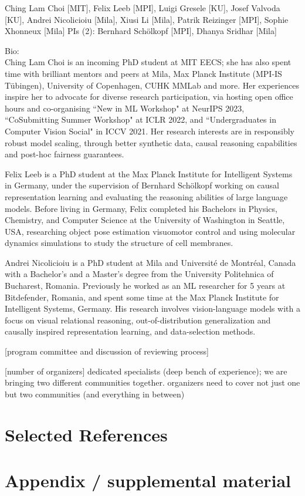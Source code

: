 \documentclass{article}
\begin{document}
Ching Lam Choi [MIT], Felix Leeb [MPI], Luigi Gresele [KU], Josef Valvoda [KU],  Andrei Nicolicioiu [Mila], Xiusi Li [Mila], Patrik Reizinger [MPI], Sophie Xhonneux [Mila]
PIs (2): Bernhard Schölkopf [MPI], Dhanya Sridhar [Mila]

Bio:\\

Ching Lam Choi is an incoming PhD student at MIT EECS; she has also spent time with brilliant mentors and peers at Mila, Max Planck Institute (MPI-IS Tübingen), University of Copenhagen, CUHK MMLab and more. Her experiences inspire her to advocate for diverse research participation, via hosting open office hours and co-organising ``New in ML Workshop" at NeurIPS 2023, ``CoSubmitting Summer Workshop" at ICLR 2022, and ``Undergraduates in Computer Vision Social" in ICCV 2021. Her research interests are in responsibly robust model scaling, through better synthetic data, causal reasoning capabilities and post-hoc fairness guarantees.

Felix Leeb is a PhD student at the Max Planck Institute for Intelligent Systems in Germany, under the supervision of Bernhard Schölkopf working on causal representation learning and evaluating the reasoning abilities of large language models. Before living in Germany, Felix completed his Bachelors in Physics, Chemistry, and Computer Science at the University of Washington in Seattle, USA, researching object pose estimation visuomotor control and using molecular dynamics simulations to study the structure of cell membranes.

Andrei Nicolicioiu is a PhD student at Mila and Université de Montréal, Canada with a Bachelor’s and a Master’s degree from the University Politehnica of Bucharest, Romania. Previously he worked as an ML researcher for 5 years at Bitdefender, Romania, and spent some time at the Max Planck Institute for Intelligent Systems, Germany. His research involves vision-language models with a focus on visual relational reasoning, out-of-distribution generalization and causally inspired representation learning, and data-selection methods.

[program committee and discussion of reviewing process]

[number of organizers] dedicated specialists (deep bench of experience); we are bringing two different communities together. organizers need to cover not just one but two communities (and everything in between)

\section{Selected References}




\newpage

\appendix

\section{Appendix / supplemental material}



\end{document}
